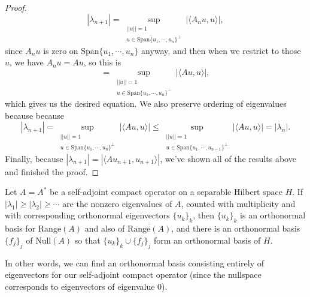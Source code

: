 \begin{proof}
\[
    |\lambda_{n+1}| = \sup_{\substack{||u|| = 1 \\ u \in \text{Span}\{u_1, \cdots, u_n\}^\perp}} |\langle A_n u, u \rangle|,
\]
since $A_n u$ is zero on $\text{Span}\{u_1, \cdots, u_n\}$ anyway, and then when we restrict to those $u$, we have $A_n u = Au$, so this is 
\[
    = \sup_{\substack{||u|| = 1 \\ u \in \text{Span}\{u_1, \cdots, u_n\}^\perp}} |\langle Au, u \rangle|,
\]
which gives us the desired equation. We also preserve ordering of eigenvalues because because
\[
    |\lambda_{n+1}| =  \sup_{\substack{||u|| = 1 \\ u \in \text{Span}\{u_1, \cdots, u_n\}^\perp}} |\langle Au, u \rangle| \le  \sup_{\substack{||u|| = 1 \\ u \in \text{Span}\{u_1, \cdots, u_{n-1}\}^\perp}} |\langle Au, u \rangle| = |\lambda_n|.
\]
Finally, because $|\lambda_{n+1}| = |\langle Au_{n+1}, u_{n+1} \rangle|$, we've shown all of the results above and finished the proof.
\end{proof}

\begin{theorem}
Let $A = A^\ast$ be a self-adjoint compact operator on a separable Hilbert space $H$. If $|\lambda_1| \ge |\lambda_2| \ge \cdots$ are the nonzero eigenvalues of $A$, counted with multiplicity and with corresponding orthonormal eigenvectors $\{u_k\}_k$, then $\{u_k\}_k$ is an orthonormal basis for $\text{Range}(A)$ and also of $\overline{\text{Range}(A)}$, and there is an orthonormal basis $\{f_j\}_j$ of $\text{Null}(A)$ so that $\{u_k\}_k \cup \{f_j\}_j$ form an orthonormal basis of $H$.
\end{theorem}

In other words, we can find an orthonormal basis consisting entirely of eigenvectors for our self-adjoint compact operator (since the nullspace corresponds to eigenvectors of eigenvalue $0$). 

